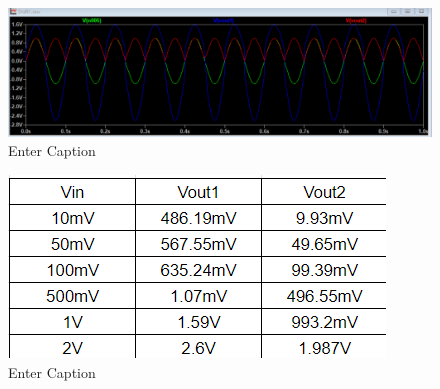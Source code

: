 \begin{figure}
    \centering
    \includegraphics[width=0.5\linewidth]{Secciones/Circuito3/simulacion1v.png}
    \caption{Enter Caption}
    \label{fig:enter-label}
\end{figure}


\begin{figure}
    \centering
    \includegraphics[width=0.5\linewidth]{Secciones/Circuito3/tabla1.png}
    \caption{Enter Caption}
    \label{fig:enter-label}
\end{figure}









